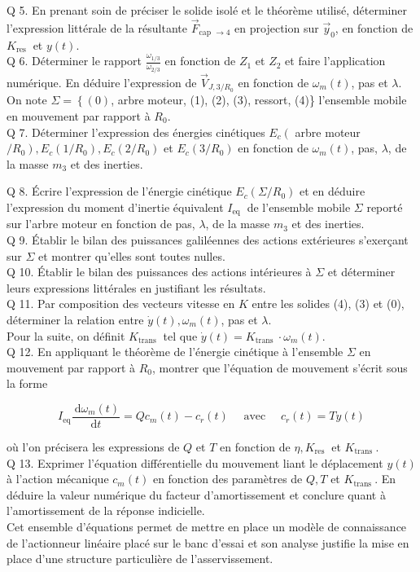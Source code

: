 \documentclass[10pt]{article}
\begin{document}
Q 5. En prenant soin de préciser le solide isolé et le théorème utilisé, déterminer l'expression littérale de la résultante $\vec{F}_{\text {cap } \rightarrow 4}$ en projection sur $\vec{y}_{0}$, en fonction de $K_{\text {res }}$ et $y(t)$.\\
Q 6. Déterminer le rapport $\frac{\omega_{1 / 3}}{\omega_{2 / 3}}$ en fonction de $Z_{1}$ et $Z_{2}$ et faire l'application numérique. En déduire l'expression de $\vec{V}_{J, 3 / R_{0}}$ en fonction de $\omega_{m}(t)$, pas et $\lambda$.\\
On note $\Sigma=\left\{(0)\right.$, arbre moteur, (1), (2), (3), ressort, (4)\} l'ensemble mobile en mouvement par rapport à $R_{0}$.\\
Q 7. Déterminer l'expression des énergies cinétiques $E_{c}\left(\right.$ arbre moteur $\left./ R_{0}\right), E_{c}\left(1 / R_{0}\right), E_{c}\left(2 / R_{0}\right)$ et $E_{c}\left(3 / R_{0}\right)$ en fonction de $\omega_{m}(t)$, pas, $\lambda$, de la masse $m_{3}$ et des inerties.

Q 8. Écrire l'expression de l'énergie cinétique $E_{c}\left(\Sigma / R_{0}\right)$ et en déduire l'expression du moment d'inertie équivalent $I_{\text {eq }}$ de l'ensemble mobile $\Sigma$ reporté sur l'arbre moteur en fonction de pas, $\lambda$, de la masse $m_{3}$ et des inerties.\\
Q 9. Établir le bilan des puissances galiléennes des actions extérieures s'exerçant sur $\Sigma$ et montrer qu'elles sont toutes nulles.\\
Q 10. Établir le bilan des puissances des actions intérieures à $\Sigma$ et déterminer leurs expressions littérales en justifiant les résultats.\\
Q 11. Par composition des vecteurs vitesse en $K$ entre les solides (4), (3) et (0), déterminer la relation entre $\dot{y}(t), \omega_{m}(t)$, pas et $\lambda$.\\
Pour la suite, on définit $K_{\text {trans }}$ tel que $\dot{y}(t)=K_{\text {trans }} \cdot \omega_{m}(t)$.\\
Q 12. En appliquant le théorème de l'énergie cinétique à l'ensemble $\Sigma$ en mouvement par rapport à $R_{0}$, montrer que l'équation de mouvement s'écrit sous la forme

$$
I_{\mathrm{eq}} \frac{\mathrm{~d} \omega_{m}(t)}{\mathrm{d} t}=Q c_{m}(t)-c_{r}(t) \quad \text { avec } \quad c_{r}(t)=T y(t)
$$

où l'on précisera les expressions de $Q$ et $T$ en fonction de $\eta, K_{\text {res }}$ et $K_{\text {trans }}$.\\
Q 13. Exprimer l'équation différentielle du mouvement liant le déplacement $y(t)$ à l'action mécanique $c_{m}(t)$ en fonction des paramètres de $Q, T$ et $K_{\text {trans }}$. En déduire la valeur numérique du facteur d'amortissement et conclure quant à l'amortissement de la réponse indicielle.\\
Cet ensemble d'équations permet de mettre en place un modèle de connaissance de l'actionneur linéaire placé sur le banc d'essai et son analyse justifie la mise en place d'une structure particulière de l'asservissement.
\end{document}

